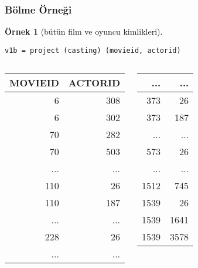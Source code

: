 \documentclass[dvipsnames]{beamer}
\theoremstyle{definition}
\theoremstyle{example}
\newtheorem{ornek}[theorem]{Örnek}
\theoremstyle{plain}
\begin{document}
\begin{frame}[fragile]
  \frametitle{Bölme Örneği}

  \begin{ornek}[bütün film ve oyuncu kimlikleri]
    \begin{lstlisting}
v1b = project (casting) (movieid, actorid)
    \end{lstlisting}

    \pause
    \begin{columns}[b]
      \begin{tiny}
      \begin{table}
        \begin{tabular}{|r|r|}\hline
MOVIEID & ACTORID\\\hline\hline
      6 &     308\\\hline
      6 &     302\\\hline
     70 &     282\\\hline
     70 &     503\\\hline
    ... &     ...\\\hline
    110 &      26\\\hline
    110 &     187\\\hline
    ... &     ...\\\hline
    228 &      26\\\hline
    ... &     ...\\\hline
        \end{tabular}
      \end{table}
      \end{tiny}

      \begin{tiny}
      \begin{table}
        \begin{tabular}{|r|r|}\hline
    ... &     ...\\\hline
    373 &      26\\\hline
    373 &     187\\\hline
    ... &     ...\\\hline
    573 &      26\\\hline
    ... &     ...\\\hline
   1512 &     745\\\hline
   1539 &      26\\\hline
   1539 &    1641\\\hline
   1539 &    3578\\\hline
        \end{tabular}
      \end{table}
      \end{tiny}
    \end{columns}
  \end{ornek}
\end{frame}
\end{document}

